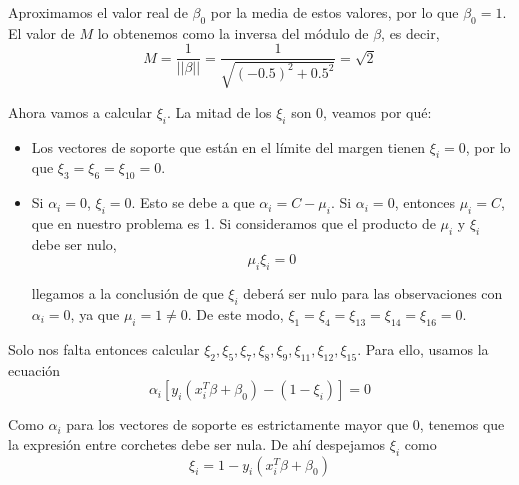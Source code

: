 \begin{example}
Aproximamos el valor real de $\beta_0$ por la media de estos valores, por lo que $\beta_0 = 1$. El valor de $M$ lo obtenemos como la inversa del módulo de $\beta$, es decir, 
\begin{equation}
M = \frac{1}{|| \beta ||} = \frac{1}{\sqrt{(-0.5)^2 + 0.5^2}} = \sqrt{2}
\end{equation}

Ahora vamos a calcular $\xi_i$. La mitad de los $\xi_i$ son 0, veamos por qué:
\begin{itemize}
\item Los vectores de soporte que están en el límite del margen tienen $\xi_i = 0$, por lo que $\xi_3 = \xi_6 = \xi_{10} = 0$.
\item Si $\alpha_i = 0$, $\xi_i = 0$. Esto se debe a que $\alpha_i = C - \mu_i$. Si $\alpha_i = 0$, entonces $\mu_i = C$, que en nuestro problema es 1. Si consideramos que el producto de $\mu_i$ y $\xi_i$ debe ser nulo, 
\begin{equation}
\mu_i \xi_i = 0
\end{equation}

\noindent llegamos a la conclusión de que $\xi_i$ deberá ser nulo para las observaciones con $\alpha_i = 0$, ya que $\mu_i = 1 \neq 0$. De este modo, $\xi_1 = \xi_4 = \xi_{13} = \xi_{14} = \xi_{16} = 0$.
\end{itemize}

\noindent Solo nos falta entonces calcular $\xi_2, \xi_5, \xi_7, \xi_8, \xi_9, \xi_{11}, \xi_{12}, \xi_{15}$. Para ello, usamos la ecuación
\begin{equation}
\alpha_i [y_i (x_i^T \beta + \beta_0) - (1 - \xi_i)] = 0
\end{equation}

Como $\alpha_i$ para los vectores de soporte es estrictamente mayor que 0, tenemos que la expresión entre corchetes debe ser nula. De ahí despejamos $\xi_i$ como 
\begin{equation}
\xi_i = 1 - y_i (x_i^T \beta + \beta_0)
\end{equation}


\end{example}
